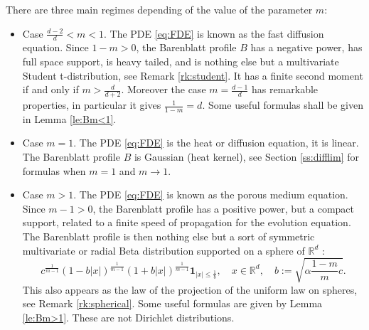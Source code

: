 \documentclass[10pt,reqno]{amsart}
\numberwithin{equation}{section}
\begin{document}
There are three main regimes depending of the value of the parameter $m$:
\begin{itemize}
\item Case $\frac{d-2}{d}<m<1$. The PDE \eqref{eq:FDE} is known as the fast
  diffusion equation. Since $1-m>0$, the Barenblatt profile $B$ has a negative
  power, has full space support, is heavy tailed, and is nothing else but a
  multivariate Student t-distribution, see Remark \ref{rk:student}.
  It has a finite second moment if and only if
  $m>\frac{d}{d+2}$. Moreover the case $m=\frac{d-1}{d}$ has remarkable
  properties, in particular it gives $\frac{1}{1-m}=d$. Some useful formulas
  shall be given in Lemma \ref{le:Bm<1}.
  \item Case $m=1$. The PDE \eqref{eq:FDE} is the heat or diffusion equation,
    it is linear. The Barenblatt profile $B$ is Gaussian (heat kernel), see
    Section \ref{ss:difflim} for formulas when $m=1$ and $m\to1$.
  \item Case $m>1$. The PDE \eqref{eq:FDE} is known as the porous medium
    equation. Since $m-1>0$, the Barenblatt profile has a positive power, but
    a compact support, related to a finite speed of propagation for the
    evolution equation. The Barenblatt profile is then nothing else but a sort
    of symmetric multivariate or radial Beta distribution supported on a
    sphere of $\mathbb{R}^d$ :
    \begin{equation}
    c^{\frac{1}{m-1}}
    (1-b|x|)^{\frac{1}{m-1}}(1+b|x|)^{\frac{1}{m-1}}    
    \mathbf{1}_{|x|\leq\frac{1}{b}},\quad x\in\mathbb{R}^d,\quad
    b:=\sqrt{\alpha\frac{1-m}{m}c}.
  \end{equation}
  This also appears as the law of the projection of the uniform law on
  spheres, see Remark \ref{rk:spherical}. Some useful formulas are given by
  Lemma \ref{le:Bm>1}. These are not Dirichlet distributions.
\end{itemize}   
\end{document}
